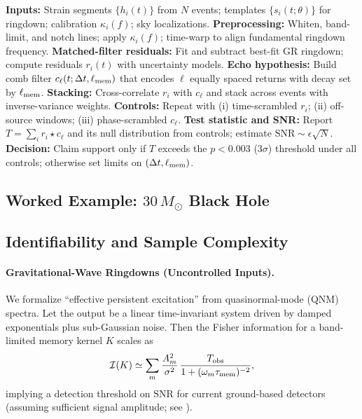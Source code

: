 \documentclass[a4paper,11pt]{article}
\theoremstyle{plain}
\theoremstyle{definition}
\theoremstyle{remark}
\begin{document}
\begin{algorithm}[htbp]
\caption{Echo-stacking protocol with nuisance controls}
\label{alg:echo-stack}
\begin{algorithmic}[1]
\State \textbf{Inputs:} Strain segments $\{h_i(t)\}$ from $N$ events; templates $\{s_i(t;\theta)\}$ for ringdown; calibration $\kappa_i(f)$; sky localizations.
\State \textbf{Preprocessing:} Whiten, band-limit, and notch lines; apply $\kappa_i(f)$; time-warp to align fundamental ringdown frequency.
\State \textbf{Matched-filter residuals:} Fit and subtract best-fit GR ringdown; compute residuals $r_i(t)$ with uncertainty models.
\State \textbf{Echo hypothesis:} Build comb filter $c_\ell(t;\Delta t,\ell_{\rm mem})$ that encodes $\ell$ equally spaced returns with decay set by $\ell_{\rm mem}$.
\State \textbf{Stacking:} Cross-correlate $r_i$ with $c_\ell$ and stack across events with inverse-variance weights.
\State \textbf{Controls:} Repeat with (i) time-scrambled $r_i$; (ii) off-source windows; (iii) phase-scrambled $c_\ell$.
\State \textbf{Test statistic and SNR:} Report $T=\sum_i r_i\star c_\ell$ and its null distribution from controls; estimate $\mathrm{SNR}\sim \epsilon\sqrt{N}$.
\State \textbf{Decision:} Claim support only if $T$ exceeds the $p<0.003$ (3$\sigma$) threshold under all controls; otherwise set limits on $(\Delta t,\ell_{\rm mem})$.
\end{algorithmic}
\end{algorithm}


\subsection{Worked Example: $30\,M_\odot$ Black Hole}

\subsection{Identifiability and Sample Complexity}

\paragraph{Gravitational-Wave Ringdowns (Uncontrolled Inputs).}
We formalize ``effective persistent excitation'' from quasinormal-mode (QNM) spectra. Let the output be a linear time-invariant system driven by damped exponentials plus sub-Gaussian noise. Then the Fisher information for a band-limited memory kernel $K$ scales as
\begin{align}
\mathcal{I}(K) \simeq \sum_{m} \frac{A_m^2}{\sigma^2}\,\frac{T_{\mathrm{obs}}}{1+(\omega_m\tau_{\rm mem})^{-2}},
\end{align}
implying a detection threshold on $\mathrm{SNR}$ for current ground-based detectors (assuming sufficient signal amplitude; see ).
\end{document}
